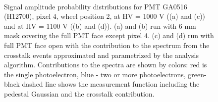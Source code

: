 \begin{figure}[h!bt] 
\centering 
   \\
  \caption{Signal amplitude probability distributions for PMT GA0516 (H12700), pixel 4, wheel position 2, at HV = 1000 V ((a) and (c)) and at HV = 1100 V ((b) and (d)). (a) and (b) run with 6 mm mask covering the full PMT face except pixel 4. (c) and (d) run with full PMT face open with the contribution to the spectrum from the crosstalk events approximated and parametrized by the analysis algorithm. Contributions to the spectra are shown by colors: red is the single photoelectron, blue - two or more photoelectrons, green-black dashed line shows the measurement function including the pedestal Gaussian and the crosstalk contribution. 
    }
\label{fig:GA0516_3}
\end{figure}
